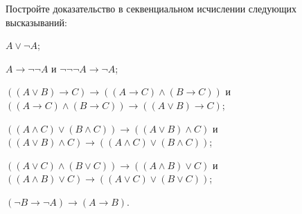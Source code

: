 Постройте доказательство в секвенциальном исчислении следующих высказываний:
\begin{enumcyr}
    \item $A \lor \lnot A$;
    \item $A \to \lnot \lnot A$ и $\lnot \lnot \lnot A \to \lnot A$;
    \item $((A \lor B) \to C) \to ((A \to C) \land (B \to C))$ и $((A \to C) \land (B \to C)) \to ((A \lor B) \to C)$;
    \item $((A \land C) \lor (B \land C)) \to ((A \lor B) \land C)$ и $((A \lor B) \land C) \to ((A \land C) \lor (B \land
	    C))$;
    \item $((A \lor C) \land (B \lor C)) \to ((A \land B) \lor C)$ и $((A \land B) \lor C) \to ((A \lor C) \lor	(B \lor C))$;
    \item $(\lnot B \to \lnot A) \to (A \to B)$.
\end{enumcyr}
